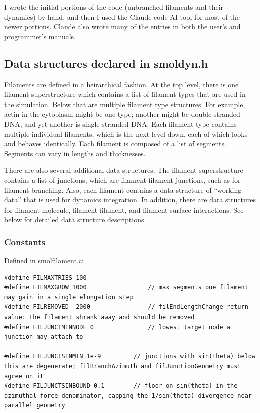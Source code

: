 \documentclass {scrbook}
\begin{document}
I wrote the initial portions of the code (unbranched filaments and their dynamics) by hand, and then I used the Claude-code AI tool for most of the newer portions. Claude also wrote many of the entries in both the user's and programmer's manuals.

\subsection{Data structures declared in smoldyn.h}

Filaments are defined in a heirarchical fashion. At the top level, there is one filament superstructure which contains a list of filament types that are used in the simulation. Below that are multiple filament type structures. For example, actin in the cytoplasm might be one type; another might be double-stranded DNA, and yet another is single-stranded DNA. Each filament type contains multiple individual filaments, which is the next level down, each of which looks and behaves identically. Each filament is composed of a list of segments. Segments can vary in lengths and thicknesses.

There are also several additional data structures. The filament superstructure contains a list of junctions, which are filament-filament junctions, such as for filament branching. Also, each filament contains a data structure of ``working data'' that is used for dynamics integration. In addition, there are data structures for filament-molecule, filament-filament, and filament-surface interactions. See below for detailed data structure descriptions.

\subsubsection{Constants}

Defined in smolfilament.c:
\begin{lstlisting}
#define FILMAXTRIES 100
#define FILMAXGROW 1000					// max segments one filament may gain in a single elongation step
#define FILREMOVED -2000				// filEndLengthChange return value: the filament shrank away and should be removed
#define FILJUNCTMINNODE 0				// lowest target node a junction may attach to

#define FILJUNCTSINMIN 1e-9			// junctions with sin(theta) below this are degenerate; filBranchAzimuth and filJunctionGeometry must agree on it
#define FILJUNCTSINBOUND 0.1		// floor on sin(theta) in the azimuthal force denominator, capping the 1/sin(theta) divergence near-parallel geometry
\end{lstlisting}
\end{document}
